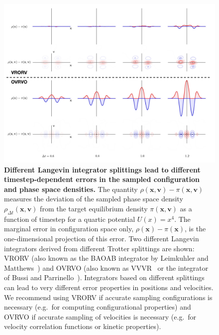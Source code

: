\documentclass[aip,jcp,preprint,superscriptaddress,floatfix]{revtex4-1}
\newcommand{\x}{\mathbf{x}}
\newcommand{\vel}{\mathbf{v}}
\begin{document}
\begin{figure}[h]
\centering
\includegraphics[width=1.0\textwidth]{figures/quartic_eq_joint_dist_array_w_x_marginals.jpg}

\caption{{\bf Different Langevin integrator splittings lead to different timestep-dependent errors in the sampled configuration and phase space densities.}
The quantity $\rho(\x,\vel) - \pi(\x,\vel)$ measures the deviation of the sampled phase space density $\rho_{\Delta t}(\x,\vel)$ from the target equilibrium density $\pi(\x,\vel)$ as a function of timestep for a quartic potential $U(x) = x^4$.
The marginal error in configuration space only, $\rho(\x) - \pi(\x)$, is the one-dimensional projection of this error.
Two different Langevin integrators derived from different Trotter splittings are shown: VRORV (also known as the BAOAB integrator by Leimkuhler and Matthews~\cite{gBAOAB,BAOAB}) and OVRVO (also known as VVVR~\cite{VVVR} or the integrator of Bussi and Parrinello~\cite{BussiParrinello}).
Integrators based on different splittings can lead to very different error properties in positions and velocities.
We recommend using VRORV if accurate sampling configurations is necessary (e.g.~for computing configurational properties) and OVRVO if accurate sampling of velocities is necessary (e.g.~for velocity correlation functions or kinetic properties).
\label{figure:timestep-dependent-error}
}
\end{figure}  
\end{document}
